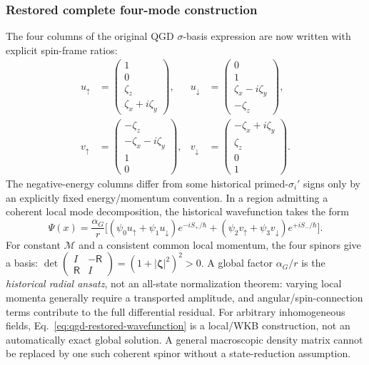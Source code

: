 \documentclass[11pt,a4paper]{article}
\begin{document}
\subsubsection{Restored complete four-mode construction}\label{sec:qgd-original-four-modes}
The four columns of the original QGD $\sigma$-basis expression are now written with explicit spin-frame ratios:
\begin{equation}\label{eq:qgd-four-modes}
\begin{aligned}
 u_\uparrow&=\begin{pmatrix}1\\0\\\zeta_z\\\zeta_x+i\zeta_y\end{pmatrix},&
 u_\downarrow&=\begin{pmatrix}0\\1\\\zeta_x-i\zeta_y\\-\zeta_z\end{pmatrix},\\[4pt]
 v_\uparrow&=\begin{pmatrix}-\zeta_z\\-\zeta_x-i\zeta_y\\1\\0\end{pmatrix},&
 v_\downarrow&=\begin{pmatrix}-\zeta_x+i\zeta_y\\\zeta_z\\0\\1\end{pmatrix}.
\end{aligned}
\end{equation}
The negative-energy columns differ from some historical primed-$\sigma_i'$ signs only by an explicitly fixed energy/momentum convention. In a region admitting a coherent local mode decomposition, the historical wavefunction takes the form
\begin{equation}\label{eq:qgd-restored-wavefunction}
\boxed{\displaystyle
 \Psi(x)=\frac{\alpha_G}{r}\bigl[
 (\psi_0u_\uparrow+\psi_1u_\downarrow)e^{-iS_+/\hbar}
 +(\psi_2v_\uparrow+\psi_3v_\downarrow)e^{+iS_-/\hbar}
 \bigr].}
\end{equation}
For constant $\mathcal M$ and a consistent common local momentum, the four spinors give a basis: $\det\left(\begin{smallmatrix}I&-\mathsf R\\\mathsf R&I\end{smallmatrix}\right)=(1+|\bm\zeta|^2)^2>0$. A global factor $\alpha_G/r$ is the \emph{historical radial ansatz}, not an all-state normalization theorem: varying local momenta generally require a transported amplitude, and angular/spin-connection terms contribute to the full differential residual. For arbitrary inhomogeneous fields, Eq.~\eqref{eq:qgd-restored-wavefunction} is a local/WKB construction, not an automatically exact global solution. A general macroscopic density matrix cannot be replaced by one such coherent spinor without a state-reduction assumption.
\end{document}
